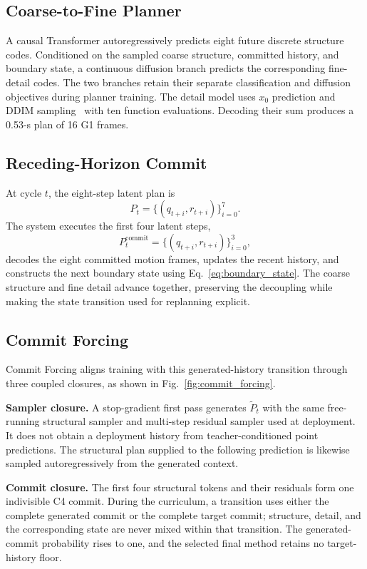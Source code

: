 \documentclass[conference]{IEEEtran}
\newcommand{\cof}{Commit Forcing}
\begin{document}
\subsection{Coarse-to-Fine Planner}
A causal Transformer autoregressively predicts eight future discrete structure codes. Conditioned on the sampled coarse structure, committed history, and boundary state, a continuous diffusion branch predicts the corresponding fine-detail codes. The two branches retain their separate classification and diffusion objectives during planner training. The detail model uses $x_0$ prediction and DDIM sampling~\cite{song2021ddim} with ten function evaluations. Decoding their sum produces a 0.53-s plan of 16 G1 frames.

\subsection{Receding-Horizon Commit}
At cycle $t$, the eight-step latent plan is
\begin{equation}
    P_t=\{(q_{t+i},r_{t+i})\}_{i=0}^{7}.
\end{equation}
The system executes the first four latent steps,
\begin{equation}
    P_t^{\mathrm{commit}}=\{(q_{t+i},r_{t+i})\}_{i=0}^{3},
    \label{eq:commit_prefix}
\end{equation}
decodes the eight committed motion frames, updates the recent history, and constructs the next boundary state using Eq.~\eqref{eq:boundary_state}. The coarse structure and fine detail advance together, preserving the decoupling while making the state transition used for replanning explicit.

\subsection{Commit Forcing}
\cof{} aligns training with this generated-history transition through three coupled closures, as shown in Fig.~\ref{fig:commit_forcing}.

\textbf{Sampler closure.} A stop-gradient first pass generates $\tilde{P}_t$ with the same free-running structural sampler and multi-step residual sampler used at deployment. It does not obtain a deployment history from teacher-conditioned point predictions. The structural plan supplied to the following prediction is likewise sampled autoregressively from the generated context.

\textbf{Commit closure.} The first four structural tokens and their residuals form one indivisible C4 commit. During the curriculum, a transition uses either the complete generated commit or the complete target commit; structure, detail, and the corresponding state are never mixed within that transition. The generated-commit probability rises to one, and the selected final method retains no target-history floor.
\end{document}
